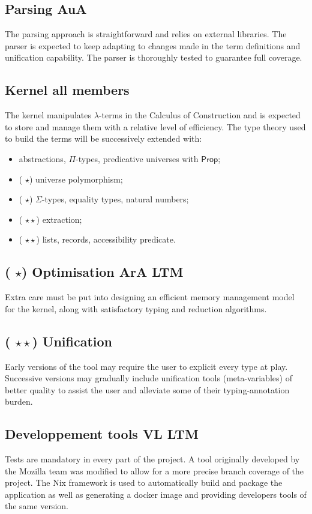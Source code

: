 \documentclass[twocolumn]{article}
\newcommand{\members}[1]{\texorpdfstring{\hfill\scriptsize #1}{}}
\newcommand{\etun}{({\color{Green} $\star$}) }
\newcommand{\etde}{({\color{Orange} $\star\star$}) }
\begin{document}
\subsection{Parsing \members{AuA}}
The parsing approach is straightforward and relies on external libraries. The parser is expected to keep adapting to changes made in the term definitions and unification capability. The parser is thoroughly tested to guarantee full coverage.


\subsection{Kernel \members{all members}}
The kernel manipulates \(\lambda\)-terms in the Calculus of Construction and is expected to store and manage them with a relative level of efficiency. The type theory used to build the terms will be successively extended with:
\begin{itemize}
  \item abstractions, \(\Pi\)-types, predicative universes with \(\mathsf{Prop}\);
  \item \etun universe polymorphism;
  \item \etun \(\Sigma\)-types, equality types, natural numbers;
  \item \etde extraction;
  \item \etde lists, records, accessibility predicate.
\end{itemize}


\subsection{\etun Optimisation \members{ArA LTM}}
Extra care must be put into designing an efficient memory management model for
the kernel, along with satisfactory typing and reduction algorithms.

\subsection{\etde Unification}
Early versions of the tool may require the user to explicit every type at play.
Successive versions may gradually include unification tools (meta-variables)
of better quality to assist the user and alleviate some of their typing-annotation
burden.

\subsection{Developpement tools \members{VL LTM}}
Tests are mandatory in every part of the project. A tool originally developed by the Mozilla team was modified to allow for a more precise branch coverage of the project.
The Nix framework is used to automatically build and package the application as well as generating a docker image and providing developers tools of the same version.

\end{document}
